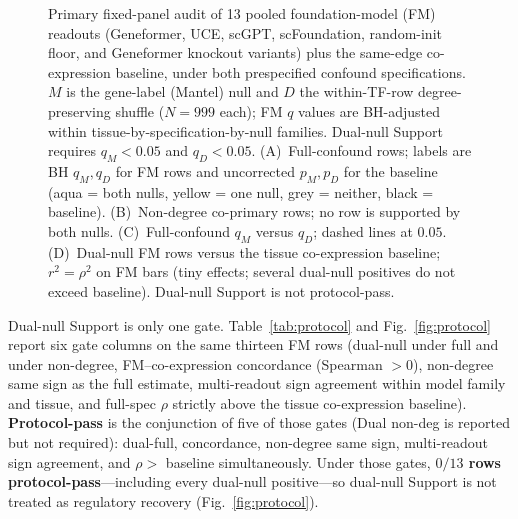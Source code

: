 \documentclass[fleqn,10pt,lineno]{wlpeerj}
\newcommand{\fitfig}[1]{\resizebox{\ifdim\width>\linewidth\linewidth\else\width\fi}{!}{#1}}
\begin{document}
\begin{figure}[!tbp]\centering
\fitfig{}
\caption{Primary fixed-panel audit of 13 pooled foundation-model (FM) readouts
(Geneformer, UCE, scGPT, scFoundation, random-init floor, and Geneformer knockout variants)
plus the same-edge co-expression baseline, under both prespecified confound specifications.
$M$ is the gene-label (Mantel) null and $D$ the within-TF-row degree-preserving shuffle
($N=999$ each); FM $q$ values are BH-adjusted within tissue-by-specification-by-null families.
Dual-null Support requires $q_M<0.05$ and $q_D<0.05$. (A)~Full-confound rows; labels are BH
$q_M,q_D$ for FM rows and uncorrected $p_M,p_D$ for the baseline (aqua = both nulls, yellow =
one null, grey = neither, black = baseline). (B)~Non-degree co-primary rows; no row is supported
by both nulls. (C)~Full-confound $q_M$ versus $q_D$; dashed lines at $0.05$. (D)~Dual-null FM
rows versus the tissue co-expression baseline; $r^{2}=\rho^{2}$ on FM bars (tiny effects;
several dual-null positives do not exceed baseline). Dual-null Support is not protocol-pass.}
\label{fig:primary}
\end{figure}

\begin{table}[!tbp]\centering
\fitfig{}
\caption{Primary fixed-panel results under the \emph{full} confound specification only (13
FM/readout rows plus the same-edge co-expression baseline). Partial Spearman $\rho$ is alignment
of each graph with the accessibility/motif proxy. $M$ denotes the gene-label null and $D$ the
within-TF-row degree-preserving target shuffle ($N=999$ each); each $q$ is BH-adjusted within its
tissue-by-specification-by-null family. Support is dual within-family BH $q_M<0.05$ and
$q_D<0.05$ (``both''); opposite-sign dual support is labeled ``both (neg)''; ``neither'' otherwise.
The co-expression baseline is tested on the same edge set outside the FM families and is marked
``--'' in Support; its entries are uncorrected $p$-values (dashes mark where no family correction
applies). Dual-null Support is not protocol-pass.}\label{tab:primary}
\end{table}

Dual-null Support is only one gate. Table~\ref{tab:protocol} and
Fig.~\ref{fig:protocol} report six gate columns on the same thirteen FM rows
(dual-null under full and under non-degree, FM--co-expression concordance
(Spearman $>0$), non-degree same sign as the full estimate, multi-readout sign agreement within
model family and tissue, and full-spec $\rho$ strictly above the tissue co-expression baseline).
\textbf{Protocol-pass} is the conjunction of five of those gates (Dual non-deg is reported but
not required): dual-full, concordance, non-degree same sign, multi-readout sign
agreement, and $\rho>$ baseline simultaneously. Under those gates,
\textbf{$0/13$ rows protocol-pass}---including every dual-null positive---so dual-null Support is not
treated as regulatory recovery (Fig.~\ref{fig:protocol}).
\end{document}
